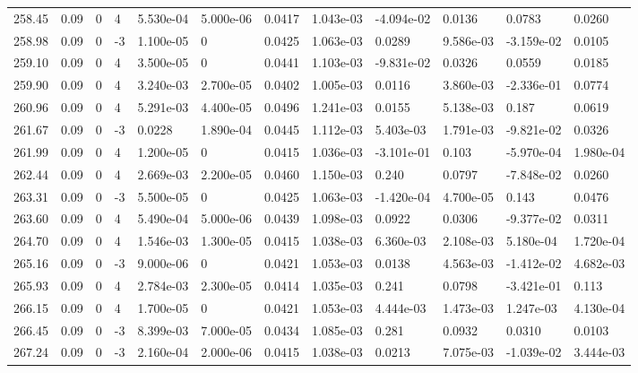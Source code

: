 \documentclass[preview]{standalone}
\begin{document}
{{{{{{{{{{{{{\begin{tabular}{L{1.2cm}C{1.2cm} C{0.3cm}C{0.5cm} C{1.4cm}C{1.4cm} C{1.4cm}C{1.4cm} C{1.6cm}C{1.6cm} C{1.6cm}C{1.6cm}}
  258.45  &  0.09  & 0     &  4 &  5.530e-04  & 5.000e-06  &  0.0417&   1.043e-03& -4.094e-02 & 0.0136   &  0.0783 & 0.0260  \\ 
  258.98  &  0.09  & 0     & -3 &  1.100e-05  & 0  &  0.0425&   1.063e-03& 0.0289 & 9.586e-03   &  -3.159e-02 & 0.0105  \\ 
  259.10  &  0.09  & 0     &  4 &  3.500e-05  & 0  &  0.0441&   1.103e-03& -9.831e-02 & 0.0326   &  0.0559 & 0.0185  \\ 
  259.90  &  0.09  & 0     &  4 &  3.240e-03  & 2.700e-05  &  0.0402&   1.005e-03& 0.0116 & 3.860e-03   &  -2.336e-01 & 0.0774  \\ 
  260.96  &  0.09  & 0     &  4 &  5.291e-03  & 4.400e-05  &  0.0496&   1.241e-03& 0.0155 & 5.138e-03   &  0.187 & 0.0619  \\ 
  261.67  &  0.09  & 0     & -3 &  0.0228  & 1.890e-04  &  0.0445&   1.112e-03& 5.403e-03 & 1.791e-03   &  -9.821e-02 & 0.0326  \\ 
  261.99  &  0.09  & 0     &  4 &  1.200e-05  & 0  &  0.0415&   1.036e-03& -3.101e-01 & 0.103   &  -5.970e-04 & 1.980e-04  \\ 
  262.44  &  0.09  & 0     &  4 &  2.669e-03  & 2.200e-05  &  0.0460&   1.150e-03& 0.240 & 0.0797   &  -7.848e-02 & 0.0260  \\ 
  263.31  &  0.09  & 0     & -3 &  5.500e-05  & 0  &  0.0425&   1.063e-03& -1.420e-04 & 4.700e-05   &  0.143 & 0.0476  \\ 
  263.60  &  0.09  & 0     &  4 &  5.490e-04  & 5.000e-06  &  0.0439&   1.098e-03& 0.0922 & 0.0306   &  -9.377e-02 & 0.0311  \\ 
  264.70  &  0.09  & 0     &  4 &  1.546e-03  & 1.300e-05  &  0.0415&   1.038e-03& 6.360e-03 & 2.108e-03   &  5.180e-04 & 1.720e-04  \\ 
  265.16  &  0.09  & 0     & -3 &  9.000e-06  & 0  &  0.0421&   1.053e-03& 0.0138 & 4.563e-03   &  -1.412e-02 & 4.682e-03  \\ 
  265.93  &  0.09  & 0     &  4 &  2.784e-03  & 2.300e-05  &  0.0414&   1.035e-03& 0.241 & 0.0798   &  -3.421e-01 & 0.113  \\ 
  266.15  &  0.09  & 0     &  4 &  1.700e-05  & 0  &  0.0421&   1.053e-03& 4.444e-03 & 1.473e-03   &  1.247e-03 & 4.130e-04  \\ 
  266.45  &  0.09  & 0     & -3 &  8.399e-03  & 7.000e-05  &  0.0434&   1.085e-03& 0.281 & 0.0932   &  0.0310 & 0.0103  \\ 
  267.24  &  0.09  & 0     & -3 &  2.160e-04  & 2.000e-06  &  0.0415&   1.038e-03& 0.0213 & 7.075e-03   &  -1.039e-02 & 3.444e-03  \\ 

\end{tabular}}}}}}}}}}}}}}
\end{document}
